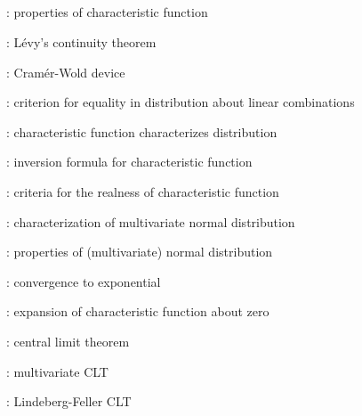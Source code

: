 \subsection*{}
\item {}: properties of characteristic function
\item {}: L\'evy's continuity theorem
\item {}: Cram\'er-Wold device
\item {}: criterion for equality in distribution about linear combinations
\item {}: characteristic function characterizes distribution
\item {}: inversion formula for characteristic function
\item {}: criteria for the realness of characteristic function
\item {}: characterization of multivariate normal distribution
\item {}: properties of (multivariate) normal distribution
\item {}: convergence to exponential
\item {}: expansion of characteristic function about zero
\item {}: central limit theorem
\item {}: multivariate CLT
\item {}: Lindeberg-Feller CLT
